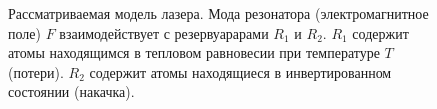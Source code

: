 \begin{figure}
\centering



\caption{Рассматриваемая модель лазера. Мода резонатора
  (электромагнитное поле) $F$ взаимодействует с резервуарарами $R_1$ и
  $R_2$. $R_1$ содержит атомы находящимся в тепловом равновесии при
  температуре $T$ (потери).  $R_2$ содержит атомы находящиеся в инвертированном
состоянии (накачка).}
\label{figPart2Ch1_1}
\end{figure}
